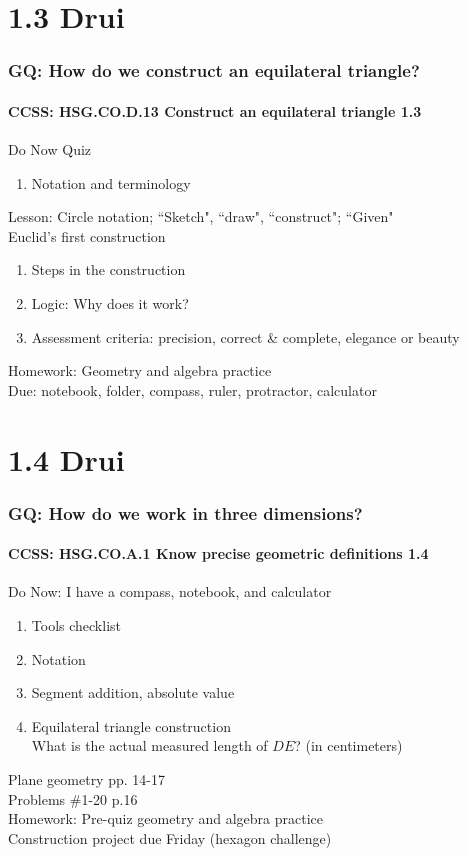 \documentclass{beamer}
\begin{document}
\section{1.3 Drui}
\frame
{
  \frametitle{GQ: How do we construct an equilateral triangle?}
  \framesubtitle{CCSS: HSG.CO.D.13 Construct an equilateral triangle \qquad \alert{1.3}}

  \begin{block}{Do Now Quiz}
  \begin{enumerate}
      \item Notation and terminology
  \end{enumerate}
  \end{block}
  Lesson: Circle notation; ``Sketch", ``draw", ``construct"; ``Given"\\[5pt]
  Euclid's first construction
  \begin{enumerate}
      \item Steps in the construction
      \item Logic: Why does it work?
      \item Assessment criteria: precision, correct \& complete, elegance or beauty
  \end{enumerate}
  \vspace{0.5cm}
  Homework: Geometry and algebra practice\\
  Due: notebook, folder, compass, ruler, protractor, calculator
}

\section{1.4 Drui}
\frame
{
  \frametitle{GQ: How do we work in three dimensions?}
  \framesubtitle{CCSS: HSG.CO.A.1 Know precise geometric definitions  \alert{1.4}}

  \begin{block}{Do Now: I have a compass, notebook, and calculator}
  \begin{enumerate}
      \item Tools checklist
      \item Notation
      \item Segment addition, absolute value
      \item Equilateral triangle construction\\
      What is the actual measured length of $DE$? (in centimeters)
  \end{enumerate}
  \end{block}
  Plane geometry pp. 14-17\\ Problems \#1-20 p.16\\
  \vspace{0.5cm}
  Homework: Pre-quiz geometry and algebra practice\\
  Construction project due Friday (hexagon challenge)
}
\end{document}
